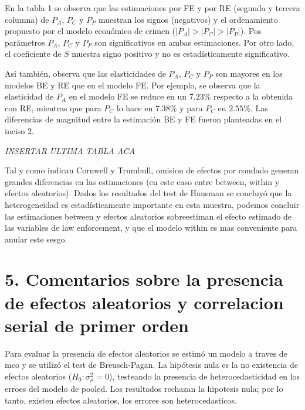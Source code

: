 \documentclass[
]{article}
\begin{document}
En la tabla 1 se observa que las estimaciones por FE y por RE (segunda y
tercera columna) de \(P_A\), \(P_C\) y \(P_P\) muestran los signos
(negativos) y el ordenamiento propuesto por el modelo económico de
crimen (\(|P_A|>|P_C|>|P_P|\)). Pos parámetros \(P_A\), \(P_C\) y
\(P_P\) son significativos en ambas estimaciones. Por otro lado, el
coeficiente de \(S\) muestra signo positivo y no es estadísticamente
significativo.

Así también, observa que las elasticidades de \(P_A\), \(P_C\) y \(P_P\)
son mayores en los modelos BE y RE que en el modelo FE. Por ejemplo, se
observa que la elasticidad de \(P_A\) en el modelo FE se reduce en un
\(7.23\%\) respecto a la obtenida con RE, mientras que para \(P_C\) lo
hace en \(7.38\%\) y para \(P_C\) en \(2.55\%\). Las diferencias de
magnitud entre la estimación BE y FE fueron planteadas en el inciso 2.

\emph{INSERTAR ULTIMA TABLA ACA}

Tal y como indican Cornwell y Trumbull, omision de efectos por condado
generan grandes diferencias en las estimaciones (en este caso entre
between, within y efectos aleatorios). Dados los resultados del test de
Hausman se concluyó que la heterogeneidad es estadísticamente importante
en esta muestra, podemos concluir las estimaciones between y efectos
aleatorios sobreestiman el efecto estimado de las variables de law
enforcement, y que el modelo within es mas conveniente para anular este
sesgo.

\hypertarget{comentarios-sobre-la-presencia-de-efectos-aleatorios-y-correlacion-serial-de-primer-orden}{%
\section{5. Comentarios sobre la presencia de efectos aleatorios y
correlacion serial de primer
orden}\label{comentarios-sobre-la-presencia-de-efectos-aleatorios-y-correlacion-serial-de-primer-orden}}

Para evaluar la presencia de efectos aleatorios se estimó un modelo a
traves de mco y se utilizó el test de Breusch-Pagan. La hipótesis nula
es la no existencia de efectos aleatorios (\(H_0: \sigma^2_\mu=0\)),
testeando la presencia de heterocedasticidad en los erroes del modelo de
pooled. Los resultados rechazan la hipotesis nula; por lo tanto, existen
efectos aleatorios, los errores son heterocedasticos.
\end{document}
